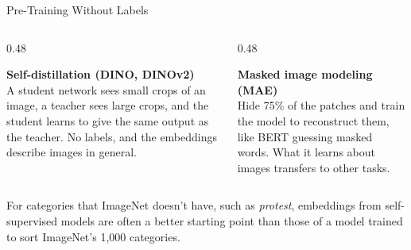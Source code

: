 \begin{frame}{Pre-Training Without Labels}
\begin{columns}[T]
\begin{column}{0.48\textwidth}
\begin{greenbox}[height=3.6cm]
\textbf{Self-distillation (DINO, DINOv2)}\\[2pt]
A student network sees small crops of an image, a teacher sees large crops, and the student learns
to give the same output as the teacher. No labels, and the embeddings describe images in general.
\end{greenbox}
\end{column}
\begin{column}{0.48\textwidth}
\begin{navybox}[height=3.6cm]
\textbf{Masked image modeling (MAE)}\\[2pt]
Hide 75\% of the patches and train the model to reconstruct them, like BERT guessing masked words.
What it learns about images transfers to other tasks.
\end{navybox}
\end{column}
\end{columns}

\vspace{0.25cm}
For categories that ImageNet doesn't have, such as \emph{protest}, embeddings from
self-supervised models are often a better starting point than those of a model trained to sort
ImageNet's 1,000 categories.

\vspace{0.1cm}
\end{frame}

